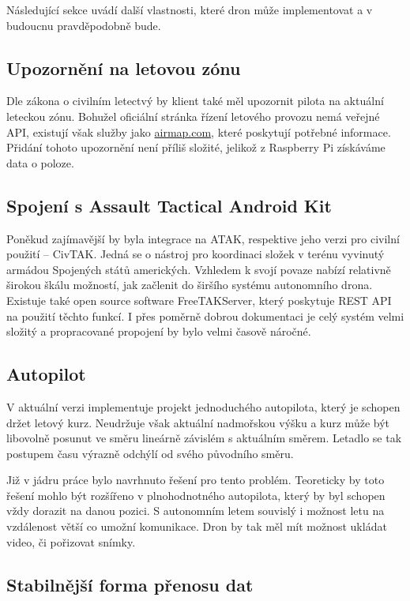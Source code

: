 \documentclass[a4paper,oneside,12pt]{report}
\begin{document}
Následující sekce uvádí další vlastnosti, které dron může implementovat a v budoucnu pravděpodobně bude.

\subsection{Upozornění na letovou zónu}
Dle zákona o civilním letectvý by klient také měl upozornit pilota na aktuální leteckou zónu.
Bohužel oficiální stránka řízení letového provozu nemá veřejné API, existují však služby jako \url{airmap.com}, které poskytují potřebné informace.
Přidání tohoto upozornění není příliš složité, jelikož z Raspberry Pi získáváme data o poloze.

\subsection{Spojení s Assault Tactical Android Kit}

Poněkud zajímavější by byla integrace na ATAK, respektive jeho verzi pro civilní použití -- CivTAK.
Jedná se o nástroj pro koordinaci složek v terénu vyvinutý armádou Spojených států amerických.
Vzhledem k svojí povaze nabízí relativně širokou škálu možností, jak začlenit do širšího systému autonomního drona.
Existuje také open source software FreeTAKServer, který poskytuje REST API na použití těchto funkcí.
I přes poměrně dobrou dokumentaci je celý systém velmi složitý a propracované propojení by bylo velmi časově náročné.

\subsection{Autopilot}

V aktuální verzi implementuje projekt jednoduchého autopilota, který je schopen držet letový kurz.
Neudržuje však aktuální nadmořskou výšku a kurz může být libovolně posunut ve směru lineárně závislém s aktuálním směrem.
Letadlo se tak postupem času výrazně odchýlí od svého původního směru.

Již v jádru práce bylo navrhnuto řešení pro tento problém.
Teoreticky by toto řešení mohlo být rozšířeno v plnohodnotného autopilota, který by byl schopen vždy dorazit na danou pozici.
S autonomním letem souvislý i možnost letu na vzdálenost větší co umožní komunikace.
Dron by tak měl mít možnost ukládat video, či pořizovat snímky.

\subsection{Stabilnější forma přenosu dat}
\end{document}
